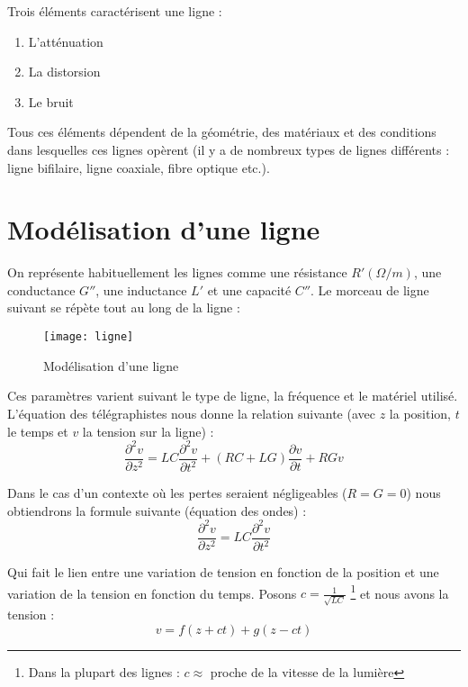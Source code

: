 Trois éléments caractérisent une ligne :
\begin{enumerate}
\item L'atténuation
\item La distorsion
\item Le bruit
\end{enumerate}

Tous ces éléments dépendent de la géométrie, des matériaux et des conditions dans lesquelles ces lignes opèrent (il y a de nombreux types de lignes différents : ligne bifilaire, ligne coaxiale, fibre optique etc.).

\section{Modélisation d'une ligne}

On représente habituellement les lignes comme une résistance $R'(\Omega / m)$, une conductance $G''$, une inductance $L'$ et une capacité $C''$. Le morceau de ligne suivant se répète tout au long de la ligne :

\begin{figure}[H]
    \centering
    \texttt{[image: ligne]}
    \caption{Modélisation d'une ligne}
\end{figure}

Ces paramètres varient suivant le type de ligne, la fréquence et le matériel utilisé. L'équation des télégraphistes nous donne la relation suivante (avec $z$ la position, $t$ le temps et $v$ la tension sur la ligne) :
\begin{equation*}
\frac{\partial^2v}{\partial z^2} = LC\frac{\partial^2v}{\partial t^2}+(RC+LG)\frac{\partial v}{\partial t}+RGv
\end{equation*}

Dans le cas d'un contexte où les pertes seraient négligeables ($R=G=0$) nous obtiendrons la formule suivante (équation des ondes) : 
\begin{equation*}
\frac{\partial^2v}{\partial z^2} = LC\frac{\partial^2v}{\partial t^2}
\end{equation*}

Qui fait le lien entre une variation de tension en fonction de la position et une variation de la tension en fonction du temps. Posons $c = \frac{1}{\sqrt{LC}}$ \footnote{Dans la plupart des lignes : $c \approx$ proche de la vitesse de la lumière} et nous avons la tension :
\begin{equation*}
v = f(z+ct) + g(z - ct)
\end{equation*}

